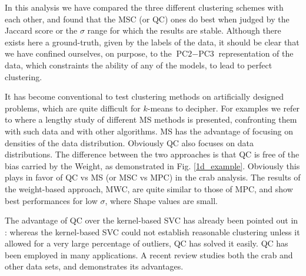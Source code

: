 \documentclass[preprint,12pt]{elsarticle}
\begin{document}
In this analysis we have compared the three different clustering schemes with each other, and found that the MSC (or QC) ones do best when judged by the Jaccard score or the $\sigma$ range for which the results are stable. Although there exists here a ground-truth, given by the labels of the data, it should be clear that we have confined ourselves, on purpose, to the $\text{PC2}-\text{PC3}$ representation of the data, which constraints the ability of any of the models, to lead to perfect clustering.

It has become conventional to test clustering methods on artificially designed problems, which are quite difficult for $k$-means to decipher. For examples we refer to \cite{Carreira2015clustering} where a lengthy study of different MS methods is presented, confronting them with such data and with other algorithms. MS has the advantage of focusing on densities of the data distribution. Obviously QC also focuses on data distributions. The difference between the two approaches is that QC is free of the bias carried by the Weight, as demonstrated in Fig. \ref{1d_example}. Obviously this plays in favor of QC vs MS (or MSC vs MPC) in the crab analysis. The results of the weight-based approach, MWC, are quite similar to those of MPC, and show best performances for low $\sigma$, where Shape values are small.

The advantage of QC \cite{horn2001} over the kernel-based SVC \cite{ben2001} has already been pointed out in \cite{horn2001}: whereas the kernel-based SVC could not establish reasonable clustering unless it allowed for a very large percentage of outliers, QC has solved it easily. QC has been employed in many applications. A recent review \cite{scott2017data} studies both the crab and other data sets, and demonstrates its advantages.
\end{document}
